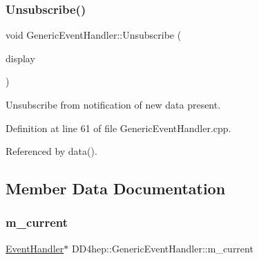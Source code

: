 \hypertarget{class_d_d4hep_1_1_generic_event_handler_a030cffac2446e410dba9dec87802e035}{}\label{class_d_d4hep_1_1_generic_event_handler_a030cffac2446e410dba9dec87802e035} 
\subsubsection{\texorpdfstring{Unsubscribe()}{Unsubscribe()}}
{\footnotesize\ttfamily void Generic\+Event\+Handler\+::\+Unsubscribe (\begin{DoxyParamCaption}\item[{\hyperlink{class_d_d4hep_1_1_event_consumer}{Event\+Consumer} $\ast$}]{display }\end{DoxyParamCaption})\hspace{0.3cm}{\ttfamily [virtual]}}



Unsubscribe from notification of new data present. 



Definition at line 61 of file Generic\+Event\+Handler.\+cpp.



Referenced by data().



\subsection{Member Data Documentation}
\hypertarget{class_d_d4hep_1_1_generic_event_handler_a63ec98dd603fe8124e8afde68f36e37a}{}\label{class_d_d4hep_1_1_generic_event_handler_a63ec98dd603fe8124e8afde68f36e37a} 
\subsubsection{\texorpdfstring{m\+\_\+current}{m\_current}}
{\footnotesize\ttfamily \hyperlink{class_d_d4hep_1_1_event_handler}{Event\+Handler}$\ast$ D\+D4hep\+::\+Generic\+Event\+Handler\+::m\+\_\+current\hspace{0.3cm}{\ttfamily [protected]}}



